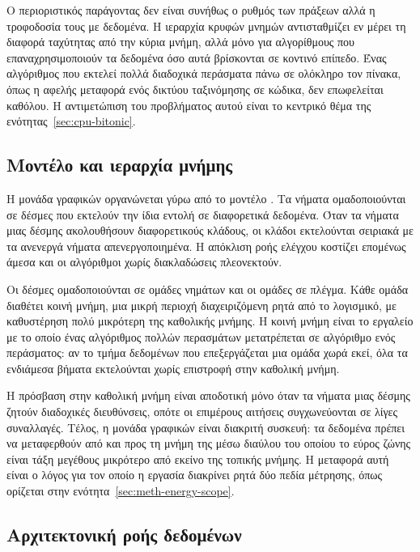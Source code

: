 Ο περιοριστικός παράγοντας δεν είναι συνήθως ο ρυθμός των πράξεων αλλά η
τροφοδοσία τους με δεδομένα. Η ιεραρχία κρυφών μνημών αντισταθμίζει εν μέρει τη
διαφορά ταχύτητας από την κύρια μνήμη, αλλά μόνο για αλγορίθμους που επαναχρησιμοποιούν
τα δεδομένα όσο αυτά βρίσκονται σε κοντινό επίπεδο. Ένας αλγόριθμος που εκτελεί
πολλά διαδοχικά περάσματα πάνω σε ολόκληρο τον πίνακα, όπως η αφελής μεταφορά
ενός δικτύου ταξινόμησης σε κώδικα, δεν επωφελείται καθόλου. Η αντιμετώπιση του
προβλήματος αυτού είναι το κεντρικό θέμα της ενότητας~\ref{sec:cpu-bitonic}.

\subsection{Μοντέλο  και ιεραρχία μνήμης }
\label{sec:bg-arch-gpu}

Η μονάδα γραφικών οργανώνεται γύρω από το μοντέλο . Τα νήματα
ομαδοποιούνται σε δέσμες που εκτελούν την ίδια εντολή σε διαφορετικά δεδομένα.
Όταν τα νήματα μιας δέσμης ακολουθήσουν διαφορετικούς κλάδους, οι κλάδοι
εκτελούνται σειριακά με τα ανενεργά νήματα απενεργοποιημένα. Η απόκλιση ροής
ελέγχου κοστίζει επομένως άμεσα και οι αλγόριθμοι χωρίς διακλαδώσεις πλεονεκτούν.

Οι δέσμες ομαδοποιούνται σε ομάδες νημάτων και οι ομάδες σε πλέγμα. Κάθε ομάδα
διαθέτει κοινή μνήμη, μια μικρή περιοχή διαχειριζόμενη ρητά από το λογισμικό, με
καθυστέρηση πολύ μικρότερη της καθολικής μνήμης. Η κοινή μνήμη είναι το εργαλείο
με το οποίο ένας αλγόριθμος πολλών περασμάτων μετατρέπεται σε αλγόριθμο ενός
περάσματος: αν το τμήμα δεδομένων που επεξεργάζεται μια ομάδα χωρά εκεί, όλα τα
ενδιάμεσα βήματα εκτελούνται χωρίς επιστροφή στην καθολική μνήμη.

Η πρόσβαση στην καθολική μνήμη είναι αποδοτική μόνο όταν τα νήματα μιας δέσμης
ζητούν διαδοχικές διευθύνσεις, οπότε οι επιμέρους αιτήσεις συγχωνεύονται σε λίγες
συναλλαγές. Τέλος, η μονάδα γραφικών είναι διακριτή συσκευή: τα δεδομένα πρέπει
να μεταφερθούν από και προς τη μνήμη της μέσω διαύλου του οποίου το εύρος ζώνης
είναι τάξη μεγέθους μικρότερο από εκείνο της τοπικής μνήμης. Η μεταφορά αυτή
είναι ο λόγος για τον οποίο η εργασία διακρίνει ρητά δύο πεδία μέτρησης, όπως
ορίζεται στην ενότητα~\ref{sec:meth-energy-scope}.

\subsection{Αρχιτεκτονική ροής δεδομένων }
\label{sec:bg-arch-npu}

